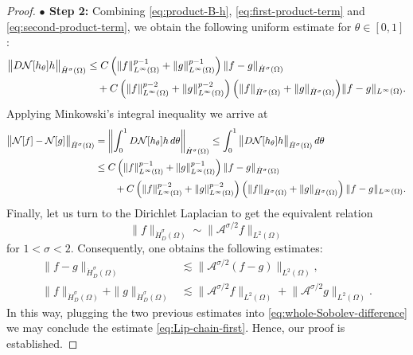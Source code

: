 \documentclass[a4paper,11pt]{article} %
\theoremstyle{remark}
\theoremstyle{definition}
\numberwithin{equation}{section}
\begin{document}
\begin{proof}
\noindent\textbf{$\bullet$ Step 2:} Combining \eqref{eq:product-B-h},
\eqref{eq:first-product-term} and
\eqref{eq:second-product-term}, we obtain the following uniform estimate for \(\theta\in[0,1]\):
\begin{align*}
\big\|D\mathcal{N}[h_\theta] h\big\|_{\dot H^\sigma(\Omega)}
&\le
C
\left(
\|f\|_{L^\infty(\Omega)}^{p-1}
+
\|g\|_{L^\infty(\Omega)}^{p-1}
\right)
\|f-g\|_{\dot H^\sigma(\Omega)}
\notag\\
&\quad+
C
\left(
\|f\|_{L^\infty(\Omega)}^{p-2}
+
\|g\|_{L^\infty(\Omega)}^{p-2}
\right) \Big(
\|f\|_{\dot H^\sigma(\Omega)}
+
\|g\|_{\dot H^\sigma(\Omega)}
\Big)
\|f-g\|_{L^\infty(\Omega)}.
\end{align*}
Applying Minkowski's integral inequality we arrive at
\begin{align}
\big\|\mathcal N[f]-\mathcal N[g]\big\|_{\dot H^\sigma(\Omega)}
&=
\left\|
\int_0^1 D\mathcal{N}[h_\theta] h\,d\theta
\right\|_{\dot H^\sigma(\Omega)}
\le
\int_0^1
\big\|D\mathcal{N}[h_\theta] h\big\|_{\dot H^\sigma(\Omega)}
\,d\theta \notag \\
&\le
C
\left(
\|f\|_{L^\infty(\Omega)}^{p-1}
+
\|g\|_{L^\infty(\Omega)}^{p-1}
\right)
\|f-g\|_{\dot H^\sigma(\Omega)} \notag \\
&\qquad+
C
\left(
\|f\|_{L^\infty(\Omega)}^{p-2}
+
\|g\|_{L^\infty(\Omega)}^{p-2}
\right) \left(
\|f\|_{\dot H^\sigma(\Omega)}
+
\|g\|_{\dot H^\sigma(\Omega)}
\right)
\|f-g\|_{L^\infty(\Omega)}.
\label{eq:whole-Sobolev-difference}
\end{align}
Finally, let us turn to the Dirichlet Laplacian to get the equivalent relation
\begin{equation*}
\|f\|_{\dot H_D^\sigma(\Omega)}
\sim
\|\mathcal A^{\sigma/2}f\|_{L^2(\Omega)}
\end{equation*}
for \(1<\sigma<2\). Consequently, one obtains the following estimates:
\begin{align*}
    \|f-g\|_{\dot H_D^\sigma(\Omega)}
&\lesssim
\big\|\mathcal A^{\sigma/2}(f-g)\big\|_{L^2(\Omega)}, \\
\|f\|_{\dot H_D^\sigma(\Omega)}
+
\|g\|_{\dot H_D^\sigma(\Omega)}
&\lesssim
\big\|\mathcal A^{\sigma/2}f\big\|_{L^2(\Omega)}
+
\big\|\mathcal A^{\sigma/2}g\big\|_{L^2(\Omega)}.
\end{align*}
In this way, plugging the two previous estimates into \eqref{eq:whole-Sobolev-difference} we may conclude the estimate \eqref{eq:Lip-chain-first}. Hence, our proof is established.
\end{proof}
\end{document}
